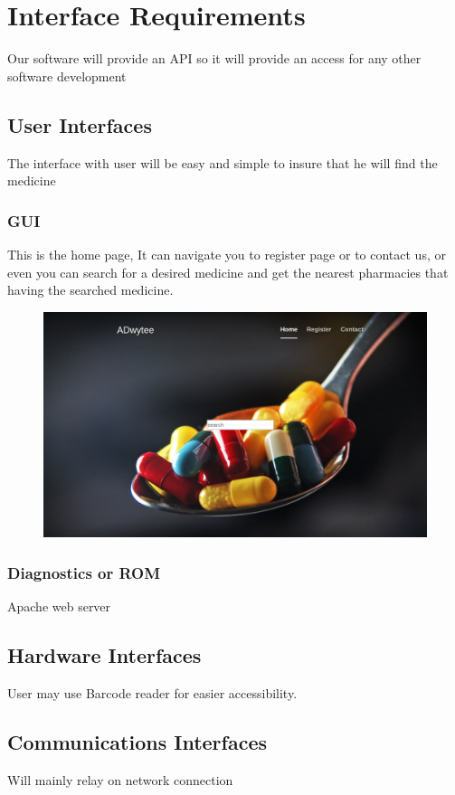 \documentclass[]{article}
\begin{document}
\section{Interface Requirements}
Our software will provide an API so it will provide an access for any other software development
\subsection{User Interfaces}
The interface with user will be easy and simple to insure  that he will find the medicine
\subsubsection {GUI}
This is the home page, It can navigate you to register page or to contact us, or even you can search for a desired medicine and get the nearest pharmacies that having the searched medicine.

\begin{figure}[H]
\centering
\includegraphics[scale=0.2]{./Home}
\end{figure}

\subsubsection {Diagnostics or ROM}
Apache web server

\subsection{Hardware Interfaces}
User may use Barcode reader for easier accessibility.
\subsection{Communications Interfaces}
Will mainly relay on network connection
\end{document}

